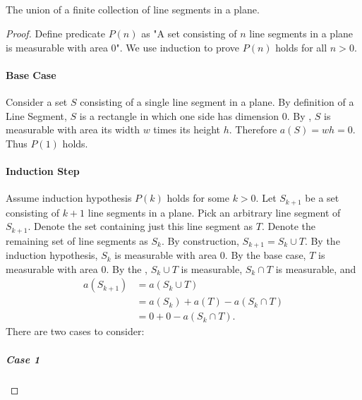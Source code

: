 \documentclass{report}
\begin{document}
\subsection{}%
\label{sub:exercise-1.7.1c}

The union of a finite collection of line segments in a plane.

\begin{proof}

  Define predicate $P(n)$ as "A set consisting of $n$ line segments in a plane
    is measurable with area $0$".
  We use induction to prove $P(n)$ holds for all $n > 0$.

  \paragraph{Base Case}%

    Consider a set $S$ consisting of a single line segment in a plane.
    By definition of a Line Segment, $S$ is a rectangle in which one side has
      dimension $0$.
    By , $S$ is measurable with area its width $w$
      times its height $h$.
    Therefore $a(S) = wh = 0$.
    Thus $P(1)$ holds.

  \paragraph{Induction Step}%

    Assume induction hypothesis $P(k)$ holds for some $k > 0$.
    Let $S_{k+1}$ be a set consisting of $k + 1$ line segments in a plane.
    Pick an arbitrary line segment of $S_{k+1}$.
    Denote the set containing just this line segment as $T$.
    Denote the remaining set of line segments as $S_k$.
    By construction, $S_{k+1} = S_k \cup T$.
    By the induction hypothesis, $S_k$ is measurable with area $0$.
    By the base case, $T$ is measurable with area $0$.
    By the , $S_k \cup T$ is measurable,
      $S_k \cap T$ is measurable, and
      \begin{align}
        a(S_{k+1})
          & = a(S_k \cup T) \nonumber \\
          & = a(S_k) + a(T) - a(S_k \cap T) \nonumber \\
          & = 0 + 0 - a(S_k \cap T). \label{sub:exercise-1.7.1c-eq1}
      \end{align}
    There are two cases to consider:

    \subparagraph{Case 1}%


\end{proof}
\end{document}
